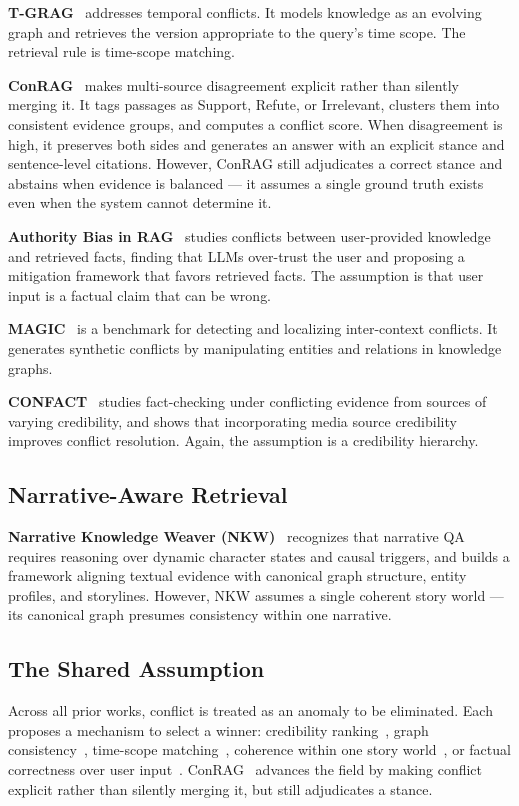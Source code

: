 \documentclass[conference]{IEEEtran}
\begin{document}
\textbf{T-GRAG}~\cite{tgrag} addresses temporal conflicts. It models knowledge as an evolving graph and retrieves the version appropriate to the query's time scope. The retrieval rule is time-scope matching.

\textbf{ConRAG}~\cite{conrag} makes multi-source disagreement explicit rather than silently merging it. It tags passages as Support, Refute, or Irrelevant, clusters them into consistent evidence groups, and computes a conflict score. When disagreement is high, it preserves both sides and generates an answer with an explicit stance and sentence-level citations. However, ConRAG still adjudicates a correct stance and abstains when evidence is balanced --- it assumes a single ground truth exists even when the system cannot determine it.

\textbf{Authority Bias in RAG}~\cite{authoritybias} studies conflicts between user-provided knowledge and retrieved facts, finding that LLMs over-trust the user and proposing a mitigation framework that favors retrieved facts. The assumption is that user input is a factual claim that can be wrong.

\textbf{MAGIC}~\cite{magic} is a benchmark for detecting and localizing inter-context conflicts. It generates synthetic conflicts by manipulating entities and relations in knowledge graphs. 

\textbf{CONFACT}~\cite{confact} studies fact-checking under conflicting evidence from sources of varying credibility, and shows that incorporating media source credibility improves conflict resolution. Again, the assumption is a credibility hierarchy.

\subsection{Narrative-Aware Retrieval}

\textbf{Narrative Knowledge Weaver (NKW)}~\cite{nkw} recognizes that narrative QA requires reasoning over dynamic character states and causal triggers, and builds a framework aligning textual evidence with canonical graph structure, entity profiles, and storylines. However, NKW assumes a single coherent story world --- its canonical graph presumes consistency within one narrative.

\subsection{The Shared Assumption}

Across all prior works, conflict is treated as an anomaly to be eliminated. Each proposes a mechanism to select a winner: credibility ranking~\cite{conflictrag,confact}, graph consistency~\cite{truthfulrag}, time-scope matching~\cite{tgrag}, coherence within one story world~\cite{nkw}, or factual correctness over user input~\cite{authoritybias}. ConRAG~\cite{conrag} advances the field by making conflict explicit rather than silently merging it, but still adjudicates a stance.
\end{document}
